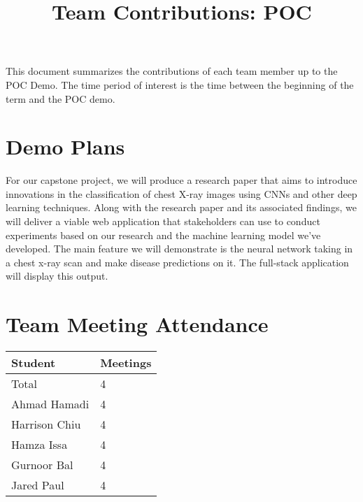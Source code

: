 \documentclass{article}
\title{Team Contributions: POC\\\progname}
\author{\authname}
\date{}
\begin{document}
\maketitle

This document summarizes the contributions of each team member up to the POC
Demo.  The time period of interest is the time between the beginning of the term
and the POC demo.

\section{Demo Plans}

For our capstone project, we will produce a research paper that aims to introduce innovations in 
the classification of chest X-ray images using CNNs and other deep learning techniques. Along with
the research paper and its associated findings, we will deliver a viable web application that 
stakeholders can use to conduct experiments based on our research and the machine learning model 
we've developed. The main feature we will demonstrate is the neural network taking in a chest x-ray
scan and make disease predictions on it. The full-stack application will display this output.

\section{Team Meeting Attendance}


\begin{table}[H]
\centering
\begin{tabular}{ll}
\toprule
\textbf{Student} & \textbf{Meetings}\\
\midrule
Total & 4\\
Ahmad Hamadi & 4\\
Harrison Chiu & 4\\
Hamza Issa & 4\\
Gurnoor Bal & 4\\
Jared Paul & 4\\
\bottomrule
\end{tabular}
\end{table}

\end{document}
